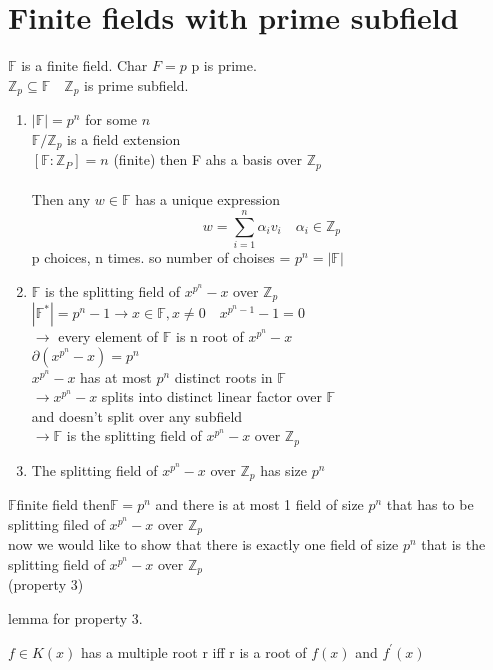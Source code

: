 \documentclass{article}
\begin{document}
\section{Finite fields with prime subfield} 
$\mathbb{F}$ is a finite field. Char $F = p$ p is prime. \\ 
$\mathbb{Z}_p \subseteq \mathbb{F} \quad \mathbb{Z}_p$ is prime subfield. 
\begin{enumerate}
    \item $|\mathbb{F}| = p^n$ for some $n $
    \\ $\mathbb{F} / \mathbb{Z}_p$ is a field extension
    \\ $[\mathbb{F} : \mathbb{Z}_P] = n$ (finite) then F ahs a basis over  $\mathbb{Z}_p$ \\
    \\ Then any $w \in \mathbb{F}$ has a unique expression $$ w = \sum_{i= 1}^{n} \alpha_i v_i \quad \alpha_i \in \mathbb{Z}_p$$
    p choices, n times. so number of choises = $p^n  = |\mathbb{F}|$ \\
    \item $\mathbb{F}$ is the splitting field of $x^{p^n} - x$ over $\mathbb{Z}_p$ \\ 
    $|\mathbb{F}^* | = p^n - 1 \rightarrow x \in \mathbb{F}, x \not = 0 \quad x^{p^n - 1} - 1 =0$
    \\ 
    $\rightarrow$ every element of $\mathbb{F}$ is n root of $x^{p^n} - x$ \\
    $\partial (x^{p^n} - x) = p^n$ \\ 
    $x^{p^n} - x$ has at most $p^n$  distinct roots in $\mathbb{F}$ \\
    $\rightarrow x^{p^n} - x$ splits into distinct linear factor over $\mathbb{F}$ \\
    and doesn't split over any subfield \\ 
    $\rightarrow \mathbb{F }$ is the splitting field of $x^{p^n} - x$ over $\mathbb{Z}_p$ \\
    \item The splitting field of $x^{p^n} - x$ over $\mathbb{Z}_p$ has size $p^n$ \\
\end{enumerate}
$\mathbb{F}$finite field then$\mathbb{F} = p^n$ and there is at most 1 field of size $p^n$ that has to be splitting filed of $x^{p^n} - x$ over $\mathbb{Z}_p$ \\

now we would like to show that there is exactly one field of size $p^n$ that is the splitting field of $x^{p^n} - x$ over $\mathbb{Z}_p$ \\ (property 3)

lemma for property 3.\begin{lemma}
    $f \in K(x)$ has a multiple root r iff r is a root of $f(x)$ and $f^\prime(x)$
\end{lemma}
\end{document}
